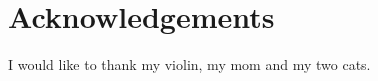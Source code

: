 \chapter*{Acknowledgements}
\makeatletter\@openrightfalse
{}
\label{acknowledgements}

I would like to thank my violin, my mom and my two cats.
